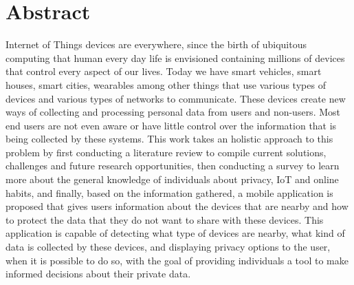 %
%
\chapter*{Abstract}
\justify

Internet of Things devices are everywhere, since the birth of ubiquitous
computing that human every day life is envisioned containing millions of
devices that control every aspect of our lives. Today we have smart vehicles,
smart houses, smart cities, wearables among other things that use various
types of devices and various types of networks to communicate. These devices
create new ways of collecting and processing personal data from users and
non-users. Most end users are not even aware or have little control over
the information that is being collected by these systems. This work takes
an holistic approach to this problem by first conducting a literature review
to compile current solutions, challenges and future research opportunities,
then conducting a survey to learn more about the general knowledge of
individuals about privacy, IoT and online habits, and finally, based on the
information gathered, a mobile application is proposed
that gives users information about the devices that are nearby and how
to protect the data that they do not want to share with these devices. This
application is capable of detecting what type of devices are nearby, what kind
of data is collected by these devices, and displaying privacy options to the user,
when it is possible to do so, with the goal of providing individuals a tool to make
informed decisions about their private data.

